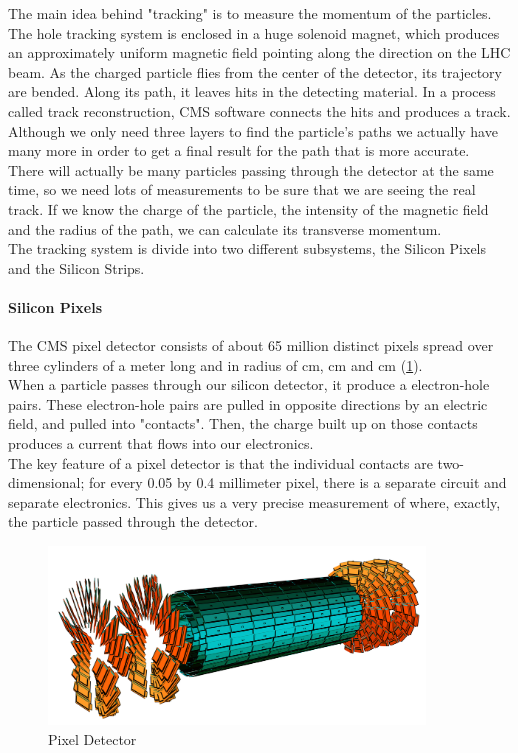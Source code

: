 The main idea behind "tracking" is to measure the momentum of the particles. The hole tracking system is enclosed in a huge solenoid magnet, which produces an approximately uniform magnetic field pointing along the direction on the LHC beam. As the charged particle flies from the center of the detector, its trajectory are bended. Along its path, it leaves hits in the detecting material.
In a process called track reconstruction, CMS software connects the hits and produces a track. Although we only need three layers to find the particle's paths we actually have many more in order to get a final result for the path that is more accurate.\\
\indent
There will actually be many particles passing through the detector at the same time, so we need lots of measurements to be sure that we are seeing the real track.
If we know the charge of the particle, the intensity of the magnetic field and the radius of the path, we can calculate its transverse momentum.\\
\indent
The tracking system is divide into two different subsystems, the Silicon Pixels and the Silicon Strips.

\paragraph{Silicon Pixels} The CMS pixel detector consists of about 65 million distinct pixels spread over three cylinders of a meter long and in radius of \unit[4]{cm}, \unit[7]{cm} and \unit[10]{cm} (\cref{fig:pixel}).\\
\indent
When a particle passes through our silicon detector, it produce a electron-hole pairs. These electron-hole pairs are pulled in opposite directions by an electric field, and pulled into "contacts". Then, the charge built up on those contacts produces a current that flows into our electronics.\\
\indent 
The key feature of a pixel detector is that the individual contacts are two-dimensional; for every 0.05 by 0.4 millimeter pixel, there is a separate circuit and separate electronics. This gives us a very precise measurement of where, exactly, the particle passed through the detector.
\begin{figure}[H]
  \centering
\includegraphics[width=10cm]{CMS_chapter_plots/pixel2}
  \caption{Pixel Detector \label{fig:pixel}}
\end{figure}

